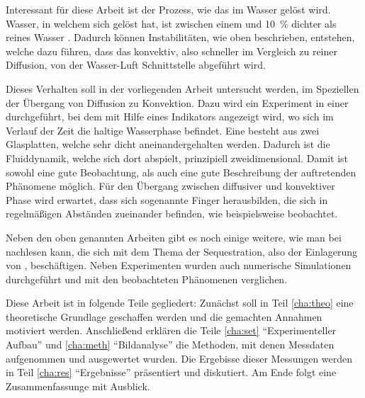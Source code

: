 Interessant für diese Arbeit ist der Prozess, wie das \COT im Wasser gelöst wird. Wasser, in welchem sich \COT gelöst hat, ist zwischen einem und \SI{10}{\percent} dichter als reines Wasser \citep{garcia}. Dadurch können Instabilitäten, wie oben beschrieben, entstehen, welche dazu führen, dass das \COT konvektiv, also schneller im Vergleich zu reiner Diffusion, von der Wasser-Luft Schnittstelle abgeführt wird.

Dieses Verhalten soll in der vorliegenden Arbeit untersucht werden, im Speziellen der Übergang von Diffusion zu Konvektion.
Dazu wird ein Experiment in einer \HSC durchgeführt, bei dem mit Hilfe eines Indikators angezeigt wird, wo sich im Verlauf der Zeit die \COTm haltige Wasserphase befindet. 
Eine \HSC besteht aus zwei Glasplatten, welche sehr dicht aneinandergehalten werden. Dadurch ist die Fluiddynamik, welche sich dort abspielt, prinzipiell zweidimensional. Damit ist sowohl eine gute Beobachtung, als auch eine gute Beschreibung der auftretenden Phänomene möglich.
Für den Übergang zwischen diffusiver und konvektiver Phase wird erwartet, dass sich sogenannte Finger herausbilden, die sich in regelmäßigen Abständen zueinander befinden, wie beispielsweise \cite{fernandez} beobachtet.

Neben den oben genannten Arbeiten gibt es noch einige weitere, wie man bei \cite{kneafsy} nachlesen kann, die sich mit dem Thema der \COTm Sequestration, also der Einlagerung von \COT, beschäftigen. Neben Experimenten wurden auch numerische Simulationen durchgeführt und mit den beobachteten Phänomenen verglichen. 

Diese Arbeit ist in folgende Teile gegliedert: Zunächst soll in Teil \ref{cha:theo} eine theoretische Grundlage geschaffen werden und die gemachten Annahmen motiviert werden. Anschließend erklären die Teile \ref{cha:set} "`Experimenteller Aufbau"' und \ref{cha:meth} "`Bildanalyse"' die Methoden, mit denen Messdaten aufgenommen und ausgewertet wurden. Die Ergebisse dieser Messungen werden in Teil \ref{cha:res} "`Ergebnisse"' präsentiert und diskutiert. Am Ende folgt eine Zusammenfassunge mit Ausblick.

